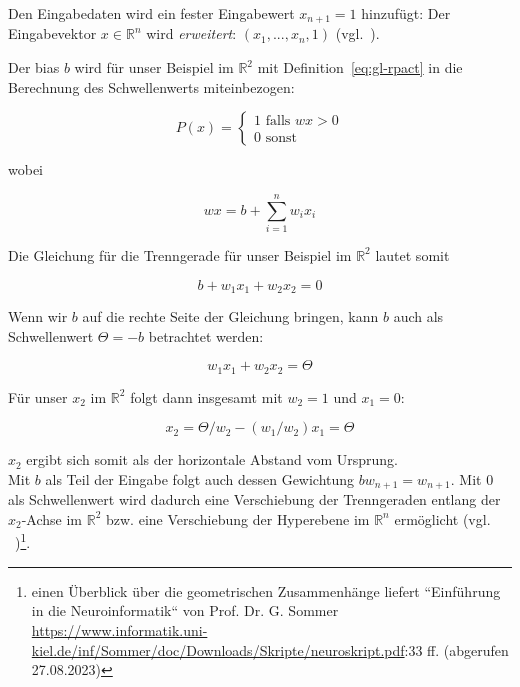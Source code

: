 Den Eingabedaten wird ein fester Eingabewert $x_{n+1} = 1$ hinzufügt: Der Eingabevektor $x \in  \mathbb{R}^n$ wird \textit{erweitert}: $(x_1, ..., x_n, 1)$ (vgl.~\cite[58]{Roj93}).

\noindent
Der bias $b$ wird für unser Beispiel im $ \mathbb{R}^2$ mit Definition~\ref{eq:gl-rpact} in die Berechnung des Schwellenwerts miteinbezogen:

\begin{equation}
P(x) = \begin{cases}
            1 \text{ falls } wx > 0 \\
            0 \text{ sonst }
\end{cases}
\end{equation}

\noindent
wobei

\begin{equation}
wx = b + \sum^n_{i=1} w_ix_i
\label{eq:gl-net}
\end{equation}

\noindent
Die Gleichung für die Trenngerade für unser Beispiel im $\mathbb{R}^2$ lautet somit

\begin{equation}
b + w_1x_1 + w_2x_2 = 0
\end{equation}

\noindent
Wenn wir $b$ auf die rechte Seite der Gleichung bringen, kann $b$ auch als Schwellenwert $\Theta = -b$ betrachtet werden:

\begin{equation}
w_1x_1 + w_2x_2 = \Theta
\end{equation}

\noindent
Für unser $x_2$ im $ \mathbb{R}^2$ folgt dann insgesamt mit $w_2 = 1$ und $x_1 = 0$:

\begin{equation}
x_2 = \Theta/w_2 -(w_1/w_2)x_1  = \Theta
\end{equation}

\noindent
$x_2$ ergibt sich somit als der horizontale Abstand vom Ursprung.\\

\noindent
Mit $b$ als Teil der Eingabe folgt auch dessen Gewichtung $bw_{n+1} = w_{n+1}$.
Mit $0$ als Schwellenwert wird dadurch eine Verschiebung der Trenngeraden entlang der $x_2$-Achse im $ \mathbb{R}^2$ bzw. eine Verschiebung der Hyperebene im $ \mathbb{R}^n$ ermöglicht (vgl. ~\cite[215]{Ert21a})\footnote{
    einen Überblick über die geometrischen Zusammenhänge liefert ``Einführung in die Neuroinformatik`` von Prof. Dr. G. Sommer \url{https://www.informatik.uni-kiel.de/inf/Sommer/doc/Downloads/Skripte/neuroskript.pdf}:33 ff. (abgerufen 27.08.2023)
}.



